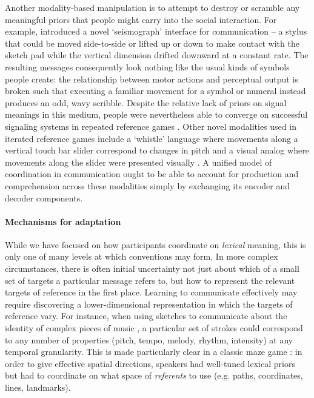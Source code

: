 Another modality-based manipulation is to attempt to destroy or scramble any meaningful priors that people might carry into the social interaction.
For example,  introduced a novel `seismograph' interface for communication -- a stylus that could be moved side-to-side or lifted up or down to make contact with the sketch pad while the vertical dimension drifted downward at a constant rate.
The resulting messages consequently look nothing like the usual kinds of symbols people create: the relationship between motor actions and perceptual output is broken such that executing a familiar movement for a symbol or numeral instead produces an odd, wavy scribble.
Despite the relative lack of priors on signal meanings in this medium, people were nevertheless able to converge on successful signaling systems in repeated reference games \cite{RobertsGalantucci12_DualityOfPatterning,RobertsEtAl15_IconocityOnCombinatoriality}.
Other novel modalities used in iterated reference games include a `whistle' language where movements along a vertical touch bar slider correspond to changes in pitch \cite{VerhoefRobertsDingemanse15_Iconicity} and a visual analog where movements along the slider were presented visually \cite{VerhoefEtAl16_TemporalLanguage}.
A unified model of coordination in communication ought to be able to account for production and comprehension across these modalities simply by exchanging its encoder and decoder components.

\paragraph{Mechanisms for adaptation}

While we have focused on how participants coordinate on \emph{lexical} meaning, this is only one of many levels at which conventions may form. 
In more complex circumstances, there is often initial uncertainty not just about which of a small set of targets a particular message refers to, but how to represent the relevant targets of reference in the first place. 
Learning to communicate effectively may require discovering a lower-dimensional representation in which the targets of reference vary.
For instance, when using sketches to communicate about the identity of complex pieces of music \cite{HealeySwobodaUmataKing07_GraphicalLanguageGames}, a particular set of strokes could correspond to any number of properties (pitch, tempo, melody, rhythm, intensity) at any temporal granularity. 
This is made particularly clear in a classic maze game \cite{GarrodAnderson87_SayingWhatYouMean}: in order to give effective spatial directions, speakers had well-tuned lexical priors but had to coordinate on what space of \emph{referents} to use (e.g. paths, coordinates, lines, landmarks). 

